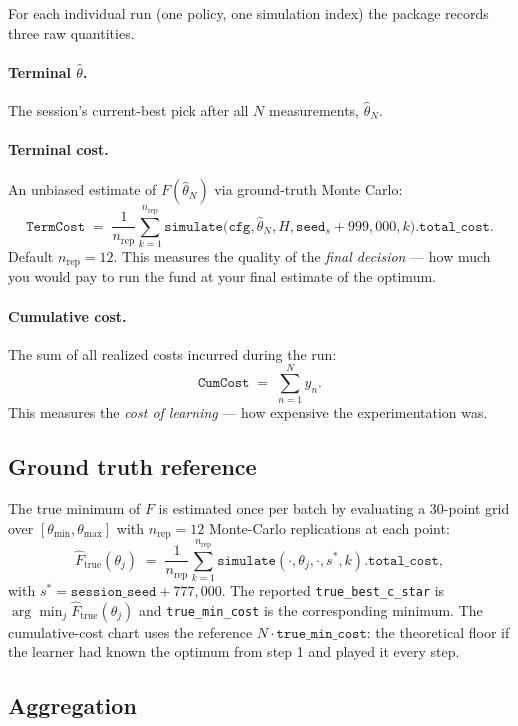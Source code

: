 \documentclass[11pt]{article}
\newcommand{\Cstar}{\theta}
\newcommand{\code}[1]{\texttt{#1}}
\begin{document}
For each individual run (one policy, one simulation index) the package
records three raw quantities.

\paragraph{Terminal $\widehat{\Cstar}$.} The session's current-best pick
after all $N$ measurements, $\widehat{\Cstar}_N$.

\paragraph{Terminal cost.} An unbiased estimate of $F(\widehat{\Cstar}_N)$
via ground-truth Monte Carlo:
\[
  \code{TermCost} \;=\; \frac{1}{n_{\mathrm{rep}}} \sum_{k=1}^{n_{\mathrm{rep}}} \code{simulate}\bigl(\code{cfg}, \widehat{\Cstar}_N, H, \code{seed}_s + 999{,}000, k\bigr).\code{total\_cost}.
\]
Default $n_{\mathrm{rep}} = 12$. This measures the quality of the
\emph{final decision} — how much you would pay to run the fund at your
final estimate of the optimum.

\paragraph{Cumulative cost.} The sum of all realized costs incurred during
the run:
\[
  \code{CumCost} \;=\; \sum_{n=1}^{N} y_n.
\]
This measures the \emph{cost of learning} — how expensive the experimentation
was.

\subsection{Ground truth reference}
\label{sec:batch:truth}

The true minimum of $F$ is estimated once per batch by evaluating a
30-point grid over $[\Cstar_{\min}, \Cstar_{\max}]$ with $n_{\mathrm{rep}} =
12$ Monte-Carlo replications at each point:
\[
  \widehat{F}_{\mathrm{true}}(\Cstar_j) \;=\; \frac{1}{n_{\mathrm{rep}}} \sum_{k=1}^{n_{\mathrm{rep}}} \code{simulate}(\cdot, \Cstar_j, \cdot, s^*, k).\code{total\_cost},
\]
with $s^* = \code{session\_seed} + 777{,}000$. The reported \code{true\_best\_c\_star}
is $\arg\min_j \widehat{F}_{\mathrm{true}}(\Cstar_j)$ and \code{true\_min\_cost}
is the corresponding minimum. The cumulative-cost chart uses the reference
$N \cdot \code{true\_min\_cost}$: the theoretical floor if the learner had
known the optimum from step 1 and played it every step.

\subsection{Aggregation}
\label{sec:batch:agg}
\end{document}
